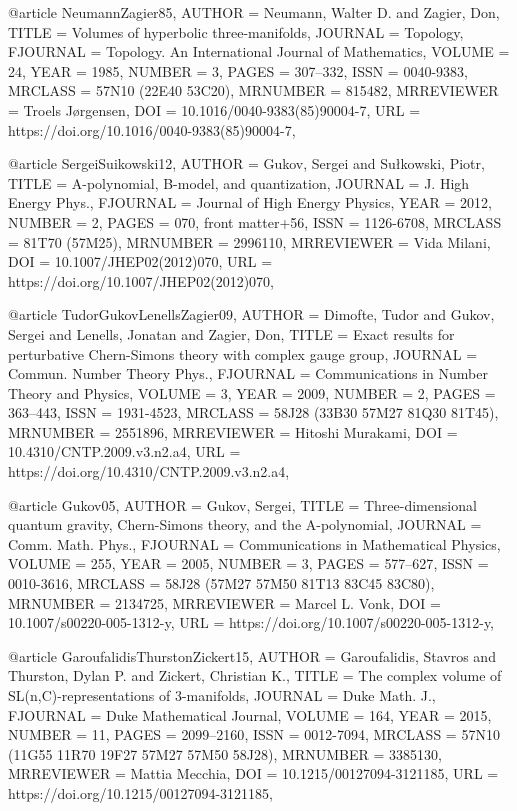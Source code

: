 @article {NeumannZagier85,
    AUTHOR = {Neumann, Walter D. and Zagier, Don},
     TITLE = {Volumes of hyperbolic three-manifolds},
   JOURNAL = {Topology},
  FJOURNAL = {Topology. An International Journal of Mathematics},
    VOLUME = {24},
      YEAR = {1985},
    NUMBER = {3},
     PAGES = {307--332},
      ISSN = {0040-9383},
   MRCLASS = {57N10 (22E40 53C20)},
  MRNUMBER = {815482},
MRREVIEWER = {Troels J\o rgensen},
       DOI = {10.1016/0040-9383(85)90004-7},
       URL = {https://doi.org/10.1016/0040-9383(85)90004-7},
}

@article {SergeiSuikowski12,
    AUTHOR = {Gukov, Sergei and Su\l kowski, Piotr},
     TITLE = {A-polynomial, {B}-model, and quantization},
   JOURNAL = {J. High Energy Phys.},
  FJOURNAL = {Journal of High Energy Physics},
      YEAR = {2012},
    NUMBER = {2},
     PAGES = {070, front matter+56},
      ISSN = {1126-6708},
   MRCLASS = {81T70 (57M25)},
  MRNUMBER = {2996110},
MRREVIEWER = {Vida Milani},
       DOI = {10.1007/JHEP02(2012)070},
       URL = {https://doi.org/10.1007/JHEP02(2012)070},
}

@article {TudorGukovLenellsZagier09,
    AUTHOR = {Dimofte, Tudor and Gukov, Sergei and Lenells, Jonatan and
              Zagier, Don},
     TITLE = {Exact results for perturbative {C}hern-{S}imons theory with
              complex gauge group},
   JOURNAL = {Commun. Number Theory Phys.},
  FJOURNAL = {Communications in Number Theory and Physics},
    VOLUME = {3},
      YEAR = {2009},
    NUMBER = {2},
     PAGES = {363--443},
      ISSN = {1931-4523},
   MRCLASS = {58J28 (33B30 57M27 81Q30 81T45)},
  MRNUMBER = {2551896},
MRREVIEWER = {Hitoshi Murakami},
       DOI = {10.4310/CNTP.2009.v3.n2.a4},
       URL = {https://doi.org/10.4310/CNTP.2009.v3.n2.a4},
}

@article {Gukov05,
    AUTHOR = {Gukov, Sergei},
     TITLE = {Three-dimensional quantum gravity, {C}hern-{S}imons theory,
              and the {A}-polynomial},
   JOURNAL = {Comm. Math. Phys.},
  FJOURNAL = {Communications in Mathematical Physics},
    VOLUME = {255},
      YEAR = {2005},
    NUMBER = {3},
     PAGES = {577--627},
      ISSN = {0010-3616},
   MRCLASS = {58J28 (57M27 57M50 81T13 83C45 83C80)},
  MRNUMBER = {2134725},
MRREVIEWER = {Marcel L. Vonk},
       DOI = {10.1007/s00220-005-1312-y},
       URL = {https://doi.org/10.1007/s00220-005-1312-y},
}

@article {GaroufalidisThurstonZickert15,
    AUTHOR = {Garoufalidis, Stavros and Thurston, Dylan P. and Zickert,
              Christian K.},
     TITLE = {The complex volume of SL(n,C)-representations
              of 3-manifolds},
   JOURNAL = {Duke Math. J.},
  FJOURNAL = {Duke Mathematical Journal},
    VOLUME = {164},
      YEAR = {2015},
    NUMBER = {11},
     PAGES = {2099--2160},
      ISSN = {0012-7094},
   MRCLASS = {57N10 (11G55 11R70 19F27 57M27 57M50 58J28)},
  MRNUMBER = {3385130},
MRREVIEWER = {Mattia Mecchia},
       DOI = {10.1215/00127094-3121185},
       URL = {https://doi.org/10.1215/00127094-3121185},
}

